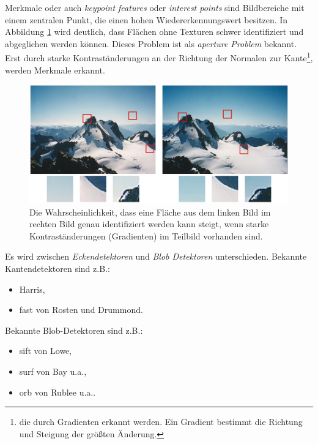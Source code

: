 Merkmale oder auch \textit{keypoint features} oder \textit{interest points} sind Bildbereiche mit einem zentralen Punkt, die einen hohen Wiedererkennungswert besitzen. In Abbildung \ref*{fig: tracking_feature_detection_prinzip} wird deutlich, dass Flächen ohne Texturen schwer identifiziert und abgeglichen werden können. Dieses Problem ist als \textit{aperture Problem} bekannt. Erst durch starke Kontraständerungen an der Richtung der Normalen zur Kante\footnote{die durch Gradienten erkannt werden. Ein Gradient bestimmt die Richtung und Steigung der größten Änderung.}, werden Merkmale erkannt\cite[Szeliski(2022) Seite 337f., ][]{szeliski2022}. 

\begin{figure}[H]
    \centering
    \includegraphics[width=\textwidth]{img/tracking/Feature-detection-problem.jpg}
    \caption[Die Wahrscheinlichkeit, dass eine Fläche aus dem linken Bild im rechten Bild genau identifiziert werden kann steigt, wenn starke Kontraständerungen (Gradienten) im Teilbild vorhanden sind.]{Die Wahrscheinlichkeit, dass eine Fläche aus dem linken Bild im rechten Bild genau identifiziert werden kann steigt, wenn starke Kontraständerungen (Gradienten) im Teilbild vorhanden sind\protect\footnotemark.}
    \label{fig: tracking_feature_detection_prinzip}
\end{figure}


Es wird zwischen \textit{Eckendetektoren} und \textit{Blob Detektoren} unterschieden. Bekannte Kantendetektoren sind z.B.:
\begin{itemize}
    \item Harris\cite*{harris1988},
    \item \acrfull{fast} von Rosten und Drummond\cite[][]{rosten2005}.
\end{itemize}
Bekannte Blob-Detektoren sind z.B.:
\begin{itemize}
    \item \acrfull{sift} von Lowe\cite{lowe1999},
    \item \acrfull{surf} von Bay u.a.\cite{bay2008},
    \item \acrfull{orb} von Rublee u.a.\cite{rublee2011}.
\end{itemize}

